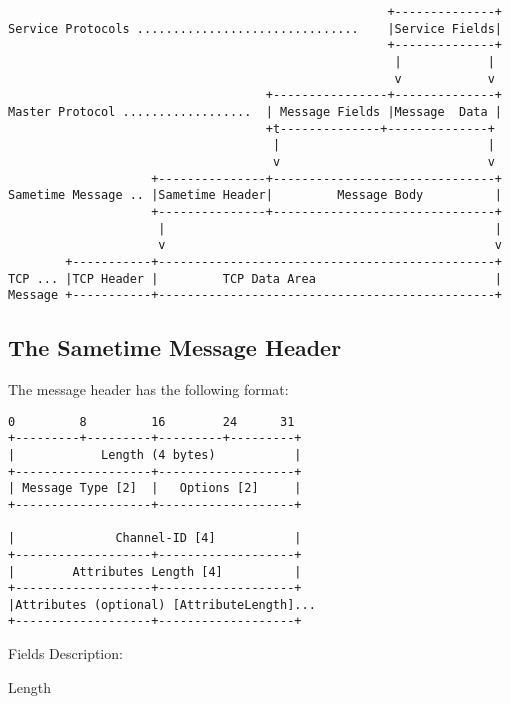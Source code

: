 \documentclass[titlepage,oneside]{book}
\begin{document}
\begin{verbatim}
                                                     +--------------+
Service Protocols ...............................    |Service Fields|
                                                     +--------------+
                                                      |            |
                                                      v            v
                                    +----------------+--------------+
Master Protocol ..................  | Message Fields |Message  Data |
                                    +t--------------+--------------+
                                     |                             |
                                     v                             v
                    +---------------+-------------------------------+
Sametime Message .. |Sametime Header|         Message Body          |
                    +---------------+-------------------------------+
                     |                                              |
                     v                                              v
        +-----------+-----------------------------------------------+
TCP ... |TCP Header |         TCP Data Area                         |
Message +-----------+-----------------------------------------------+
\end{verbatim}

\subsection{The Sametime Message Header}

\par{} The message header has the following format:

\begin{verbatim}
0         8         16        24      31
+---------+---------+---------+---------+
|            Length (4 bytes)           |
+-------------------+-------------------+
| Message Type [2]  |   Options [2]     |
+-------------------+-------------------+

|              Channel-ID [4]           |
+-------------------+-------------------+
|        Attributes Length [4]          |
+-------------------+-------------------+
|Attributes (optional) [AttributeLength]...
+-------------------+-------------------+
\end{verbatim}

\par{} Fields Description:

\par{}Length
\end{document}
